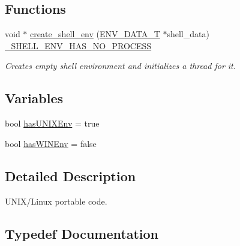 \subsection*{Functions}
\begin{DoxyCompactItemize}
\item 
void $\ast$ \hyperlink{namespacecrunchy_1_1_u_n_i_x___portable_a783c5685096669bb59980444a7c8b37c}{create\+\_\+shell\+\_\+env} (\hyperlink{namespacecrunchy_1_1_u_n_i_x___portable_a200439e6a525bf357a766278278cda8f}{E\+N\+V\+\_\+\+D\+A\+T\+A\+\_\+\+T} $\ast$shell\+\_\+data) \hyperlink{_signatures_8h_a4cf7ff8aeb847b5144d37bb0f2818387}{\+\_\+\+S\+H\+E\+L\+L\+\_\+\+E\+N\+V\+\_\+\+H\+A\+S\+\_\+\+N\+O\+\_\+\+P\+R\+O\+C\+E\+S\+S}
\begin{DoxyCompactList}\small\item\em Creates empty shell environment and initializes a thread for it. \end{DoxyCompactList}\end{DoxyCompactItemize}
\subsection*{Variables}
\begin{DoxyCompactItemize}
\item 
bool \hyperlink{namespacecrunchy_1_1_u_n_i_x___portable_a84e6dc3bfb38f92ffc2bb374b3819604}{has\+U\+N\+I\+X\+Env} = true
\item 
bool \hyperlink{namespacecrunchy_1_1_u_n_i_x___portable_a1df8cb012e6cbb395a83d8d965e55ae6}{has\+W\+I\+N\+Env} = false
\end{DoxyCompactItemize}


\subsection{Detailed Description}
U\+N\+I\+X/\+Linux portable code. 

\subsection{Typedef Documentation}
\hypertarget{namespacecrunchy_1_1_u_n_i_x___portable_a200439e6a525bf357a766278278cda8f}{}
